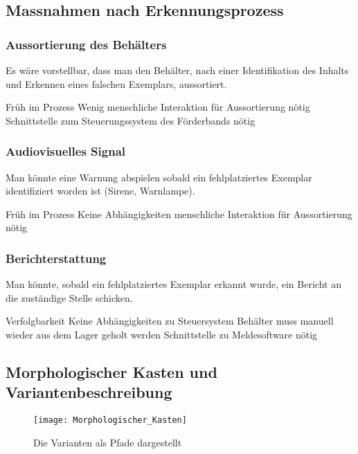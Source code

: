 \subsection{Massnahmen nach Erkennungsprozess}

\subsubsection{Aussortierung des Behälters}
Es wäre vorstellbar, dass man den Behälter, nach einer Identifikation des Inhalts und Erkennen eines falschen Exemplars, aussortiert.
\begin{itemize}
	\pro Früh im Prozess
	\pro Wenig menschliche Interaktion für Aussortierung nötig
	\con Schnittstelle zum Steuerungssystem des Förderbands nötig
\end{itemize}

\subsubsection{Audiovisuelles Signal}
Man könnte eine Warnung abspielen sobald ein fehlplatziertes Exemplar identifiziert worden ist (Sirene, Warnlampe).
\begin{itemize}
	\pro Früh im Prozess
	\pro Keine Abhängigkeiten
	\con menschliche Interaktion für Aussortierung nötig
\end{itemize}

\subsubsection{Berichterstattung}
Man könnte, sobald ein fehlplatziertes Exemplar erkannt wurde, ein Bericht an die zuständige Stelle schicken.
\begin{itemize}
	\pro Verfolgbarkeit
	\pro Keine Abhängigkeiten zu Steuersystem
	\con Behälter muss manuell wieder aus dem Lager geholt werden
	\con Schnittstelle zu Meldesoftware nötig
\end{itemize}

\newpage

\subsection{Morphologischer Kasten und Variantenbeschreibung}

\begin{figure}[h!]
	\texttt{[image: Morphologischer\_Kasten]}
	\caption{Die Varianten als Pfade dargestellt}
	\label{fig:MorphKasten}
\end{figure}

